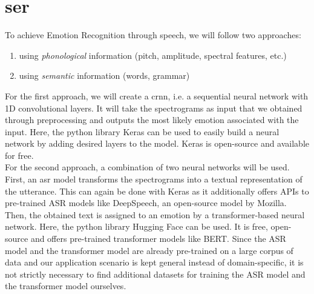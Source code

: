 \newpage
\section{\acrlong{ser}}
To achieve Emotion Recognition through speech, we will follow two approaches: 
\begin{enumerate}
    \item using \emph{phonological} information (pitch, amplitude, spectral features, etc.)
    \item using \emph{semantic} information (words, grammar)
\end{enumerate}

\vspace{5mm}

\noindent For the first approach, we will create a \acrfull{crnn},  i.e. a sequential neural network with 1D convolutional layers. It will take the spectrograms as input that we obtained through preprocessing and outputs the most likely emotion associated with the input. Here, the python library Keras can be used to easily build a neural network by adding desired layers to the model. Keras is open-source and available for free. \\

\noindent For the second approach, a combination of two neural networks will be used. First, an \acrfull{asr} model transforms the spectrograms into a textual representation of the utterance. This can again be done with Keras as it additionally offers APIs to pre-trained ASR models like DeepSpeech, an open-source model by Mozilla.
Then, the obtained text is assigned to an emotion by a transformer-based neural network. Here, the python library Hugging Face can be used. It is free, open-source and offers pre-trained transformer models like BERT. 
Since the ASR model and the transformer model are already pre-trained on a large corpus of data and our application scenario is kept general instead of domain-specific, it is not strictly necessary to find additional datasets for training the ASR model and the transformer model ourselves. \\

